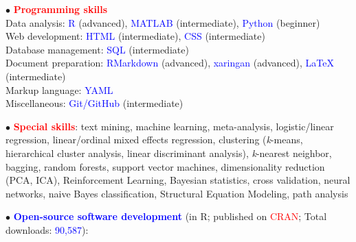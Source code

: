 \documentclass[10pt]{article}
\begin{document}
	$\bullet$ \textcolor{red}{\textbf{Programming skills}}\\
	\hspace*{0.1in} Data analysis: \textcolor{blue}{R} (advanced), \textcolor{blue}{MATLAB} (intermediate), \textcolor{blue}{Python} (beginner)\\
	\hspace*{0.1in} Web development: \textcolor{blue}{HTML} (intermediate), \textcolor{blue}{CSS} (intermediate)\\
	\hspace*{0.1in} Database management: \textcolor{blue}{SQL} (intermediate)\\
	\hspace*{0.1in}	Document preparation: \textcolor{blue}{RMarkdown} (advanced), \textcolor{blue}{xaringan} (advanced), \textcolor{blue}{\LaTeX{}} (intermediate)\\
	\hspace*{0.1in}	Markup language: \textcolor{blue}{YAML}\\
	\hspace*{0.1in} Miscellaneous: \textcolor{blue}{Git/GitHub} (intermediate)
	\miniskip
	
	$\bullet$ \textcolor{red}{\textbf{Special skills}}: text mining, machine learning, meta-analysis, logistic/linear regression, linear/ordinal mixed \hspace*{0.1in}effects regression, clustering (\textit{k}-means, hierarchical cluster analysis, linear discriminant analysis), \textit{k}-nearest \hspace*{0.1in}neighbor, bagging, random forests, support vector machines, dimensionality reduction (PCA, ICA), \hspace*{0.1in}Reinforcement Learning, Bayesian statistics, cross validation, neural networks, naive Bayes classification, \hspace*{0.1in}Structural Equation Modeling, path analysis
	\miniskip
	
	$\bullet$ \textcolor{blue}{\textbf{Open-source software development}} (in R; published on \textcolor{red}{CRAN}; Total downloads: \textcolor{blue}{90,587}):
	 \vspace*{-0.09in}
	 
\end{document}
